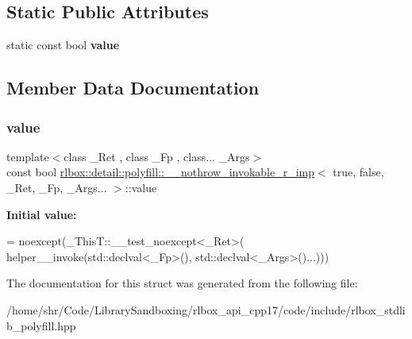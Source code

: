 \subsection*{Static Public Attributes}
\begin{DoxyCompactItemize}
\item 
static const bool {\bfseries value}
\end{DoxyCompactItemize}


\subsection{Member Data Documentation}
\mbox{\label{structrlbox_1_1detail_1_1polyfill_1_1____nothrow__invokable__r__imp_3_01true_00_01false_00_01__R20797f25b6d2c31e27d840915001dc22_a9c532bad2cdf463a2e7d625781ef4c70}} 
\subsubsection{\texorpdfstring{value}{value}}
{\footnotesize\ttfamily template$<$class \+\_\+\+Ret , class \+\_\+\+Fp , class... \+\_\+\+Args$>$ \\
const bool \hyperlink{structrlbox_1_1detail_1_1polyfill_1_1____nothrow__invokable__r__imp}{rlbox\+::detail\+::polyfill\+::\+\_\+\+\_\+nothrow\+\_\+invokable\+\_\+r\+\_\+imp}$<$ true, false, \+\_\+\+Ret, \+\_\+\+Fp, \+\_\+\+Args... $>$\+::value\hspace{0.3cm}{\ttfamily [static]}}

{\bfseries Initial value\+:}
\begin{DoxyCode}
= noexcept(\_ThisT::\_\_test\_noexcept<\_Ret>(
    helper\_\_invoke(std::declval<\_Fp>(), std::declval<\_Args>()...)))
\end{DoxyCode}


The documentation for this struct was generated from the following file\+:\begin{DoxyCompactItemize}
\item 
/home/shr/\+Code/\+Library\+Sandboxing/rlbox\+\_\+api\+\_\+cpp17/code/include/rlbox\+\_\+stdlib\+\_\+polyfill.\+hpp\end{DoxyCompactItemize}
